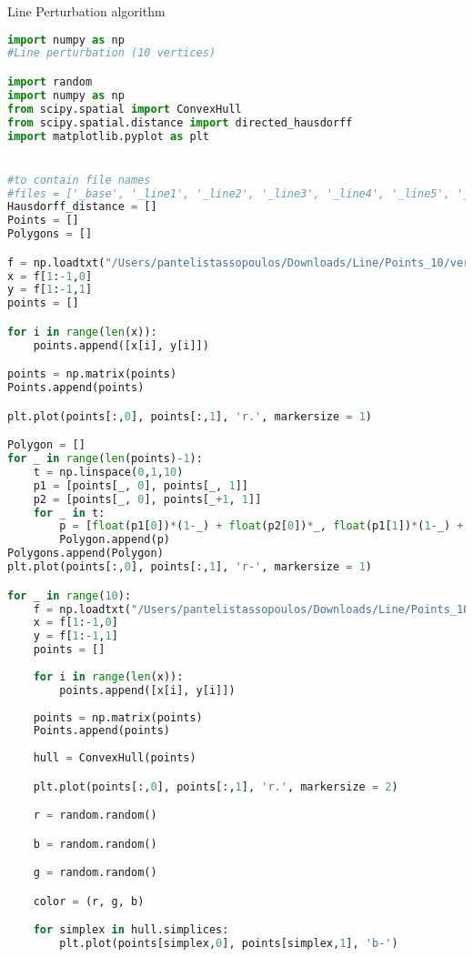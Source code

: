 \documentclass{article}
\begin{document}
\begin{codeblock}{Line Perturbation algorithm}
\begin{lstlisting}[language=Python]
import numpy as np
#Line perturbation (10 vertices)

import random
import numpy as np
from scipy.spatial import ConvexHull
from scipy.spatial.distance import directed_hausdorff
import matplotlib.pyplot as plt


#to contain file names
#files = ['_base', '_line1', '_line2', '_line3', '_line4', '_line5', '_line6', '_line7', '_line8', '_line9']
Hausdorff_distance = [] 
Points = []
Polygons = []

f = np.loadtxt("/Users/pantelistassopoulos/Downloads/Line/Points_10/verticeszTreeLine10Base.txt", usecols =(0,1), dtype = str)
x = f[1:-1,0]
y = f[1:-1,1]
points = []

for i in range(len(x)):
    points.append([x[i], y[i]])

points = np.matrix(points)  
Points.append(points)

plt.plot(points[:,0], points[:,1], 'r.', markersize = 1)

Polygon = []
for _ in range(len(points)-1):
    t = np.linspace(0,1,10)
    p1 = [points[_, 0], points[_, 1]]
    p2 = [points[_, 0], points[_+1, 1]]
    for _ in t:
        p = [float(p1[0])*(1-_) + float(p2[0])*_, float(p1[1])*(1-_) + float(p2[1])*_]
        Polygon.append(p)
Polygons.append(Polygon)
plt.plot(points[:,0], points[:,1], 'r-', markersize = 1)

for _ in range(10):
    f = np.loadtxt("/Users/pantelistassopoulos/Downloads/Line/Points_10/verticeszTreeLine10_"+str(_)+"_"+str(10-_)+".txt", usecols =(0,1), dtype = str)
    x = f[1:-1,0]
    y = f[1:-1,1]
    points = []
                   
    for i in range(len(x)):
        points.append([x[i], y[i]])
                   
    points = np.matrix(points)  
    Points.append(points)
            
    hull = ConvexHull(points)

    plt.plot(points[:,0], points[:,1], 'r.', markersize = 2)

    r = random.random()

    b = random.random()

    g = random.random()

    color = (r, g, b)

    for simplex in hull.simplices:
        plt.plot(points[simplex,0], points[simplex,1], 'b-')


\end{lstlisting}
\end{codeblock}
\end{document}
